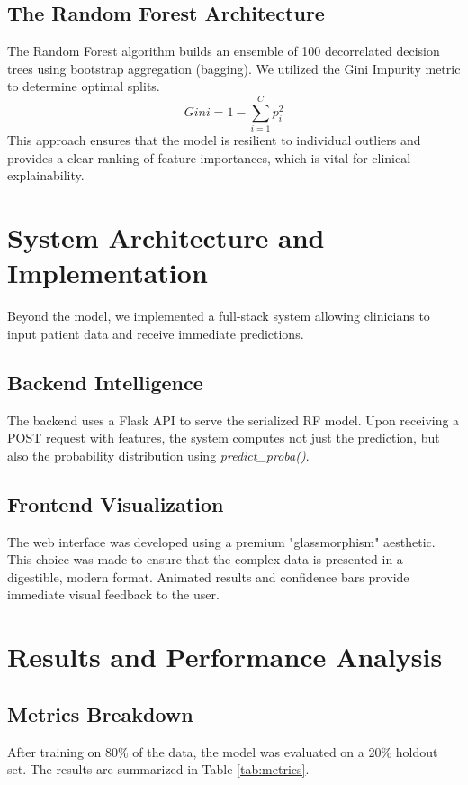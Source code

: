 \documentclass[10pt,journal,compsoc]{IEEEtran}
\begin{document}
\subsection{The Random Forest Architecture}
The Random Forest algorithm builds an ensemble of 100 decorrelated decision trees using bootstrap aggregation (bagging). We utilized the Gini Impurity metric to determine optimal splits. 
\begin{equation}
Gini = 1 - \sum_{i=1}^{C} p_i^2
\end{equation}
This approach ensures that the model is resilient to individual outliers and provides a clear ranking of feature importances, which is vital for clinical explainability.

\section{System Architecture and Implementation}
Beyond the model, we implemented a full-stack system allowing clinicians to input patient data and receive immediate predictions. 

\subsection{Backend Intelligence}
The backend uses a Flask API to serve the serialized RF model. Upon receiving a POST request with features, the system computes not just the prediction, but also the probability distribution using \textit{predict\_proba()}.

\subsection{Frontend Visualization}
The web interface was developed using a premium "glassmorphism" aesthetic. This choice was made to ensure that the complex data is presented in a digestible, modern format. Animated results and confidence bars provide immediate visual feedback to the user.

\section{Results and Performance Analysis}

\subsection{Metrics Breakdown}
After training on 80\% of the data, the model was evaluated on a 20\% holdout set. The results are summarized in Table \ref{tab:metrics}.
\end{document}
